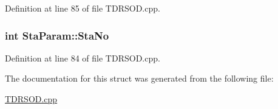 Definition at line 85 of file T\-D\-R\-S\-O\-D.\-cpp.

\hypertarget{structStaParam_a74ee32501a8df6cf68720c4085e73d40}{
\subsubsection[{Sta\-No}]{\setlength{\rightskip}{0pt plus 5cm}int Sta\-Param\-::\-Sta\-No}}\label{structStaParam_a74ee32501a8df6cf68720c4085e73d40}


Definition at line 84 of file T\-D\-R\-S\-O\-D.\-cpp.



The documentation for this struct was generated from the following file\-:\begin{DoxyCompactItemize}
\item 
\hyperlink{TDRSOD_8cpp}{T\-D\-R\-S\-O\-D.\-cpp}\end{DoxyCompactItemize}
